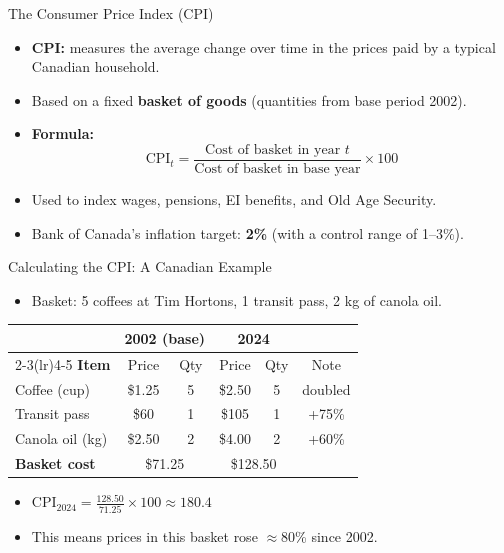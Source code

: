 \documentclass[aspectratio=169]{beamer}
\begin{document}
\begin{frame}{The Consumer Price Index (CPI)}
\transfade
\begin{itemize}
  \item \textbf{CPI:} measures the average change over time in the prices paid by a typical Canadian household.
  \item Based on a fixed \textbf{basket of goods} (quantities from base period 2002).
  \item \textbf{Formula:}
  \[
    \text{CPI}_t = \frac{\text{Cost of basket in year } t}{\text{Cost of basket in base year}} \times 100
  \]
  \item Used to index wages, pensions, EI benefits, and Old Age Security.
  \item Bank of Canada's inflation target: \textbf{2\%} (with a control range of 1--3\%).
\end{itemize}
\end{frame}

\begin{frame}{Calculating the CPI: A Canadian Example}
\transfade
\small
\begin{itemize}
  \item Basket: 5 coffees at Tim Hortons, 1 transit pass, 2 kg of canola oil.
\end{itemize}
\vspace{0.3em}
\renewcommand{\arraystretch}{1.3}
\begin{tabular}{lccccc}
\toprule
 & \multicolumn{2}{c}{\textbf{2002 (base)}} & \multicolumn{2}{c}{\textbf{2024}} & \\
\cmidrule(lr){2-3}\cmidrule(lr){4-5}
\textbf{Item} & Price & Qty & Price & Qty & Note \\
\midrule
Coffee (cup) & \$1.25 & 5 & \$2.50 & 5 & doubled \\
Transit pass & \$60 & 1 & \$105 & 1 & +75\% \\
Canola oil (kg) & \$2.50 & 2 & \$4.00 & 2 & +60\% \\
\midrule
\textbf{Basket cost} & \multicolumn{2}{c}{\$71.25} & \multicolumn{2}{c}{\$128.50} & \\
\bottomrule
\end{tabular}
\begin{itemize}
  \item $\text{CPI}_{2024} = \frac{128.50}{71.25} \times 100 \approx \mathbf{180.4}$
  \item This means prices in this basket rose $\approx$80\% since 2002.
\end{itemize}
\end{frame}
\end{document}
